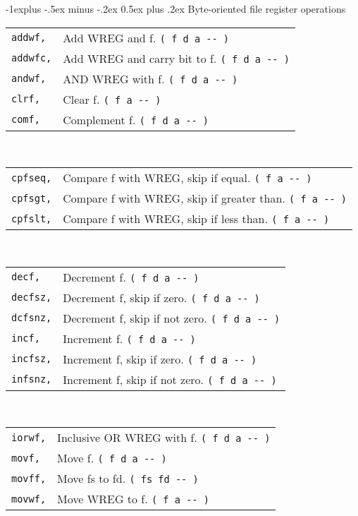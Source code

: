 \documentclass[10pt,landscape,a4paper]{article}
\makeatletter
\renewcommand{\subsection}{\@startsection{subsection}{2}{0mm}%
                                {-1explus -.5ex minus -.2ex}%
                                {0.5ex plus .2ex}%
                                {\normalfont\normalsize\bfseries}}
\makeatother
\begin{document}
\begin{multicols}{3}
\subsection{Byte-oriented file register operations}
\begin{tabular}{@{}ll@{}}
\verb!addwf,!  & Add WREG and f. \verb!( f d a -- )! \\
\verb!addwfc,!  & Add WREG and carry bit to f. \verb!( f d a -- )! \\
\verb!andwf,!  & AND WREG with f. \verb!( f d a -- )! \\
\verb!clrf,!  & Clear f. \verb!( f a -- )! \\
\verb!comf,!  & Complement f. \verb!( f d a -- )! \\
\end{tabular} \\
\begin{tabular}{@{}ll@{}}
\verb!cpfseq,!  & Compare f with WREG, skip if equal. \verb!( f a -- )! \\
\verb!cpfsgt,!  & Compare f with WREG, skip if greater than. \verb!( f a -- )! \\
\verb!cpfslt,!  & Compare f with WREG, skip if less than. \verb!( f a -- )! \\
\end{tabular} \\
\begin{tabular}{@{}ll@{}}
\verb!decf,!  & Decrement f. \verb!( f d a -- )! \\
\verb!decfsz,!  & Decrement f, skip if zero. \verb!( f d a -- )! \\
\verb!dcfsnz,!  & Decrement f, skip if not zero. \verb!( f d a -- )! \\
\verb!incf,!  & Increment f. \verb!( f d a -- )! \\
\verb!incfsz,!  & Increment f, skip if zero. \verb!( f d a -- )! \\
\verb!infsnz,!  & Increment f, skip if not zero. \verb!( f d a -- )! \\
\end{tabular} \\
\begin{tabular}{@{}ll@{}}
\verb!iorwf,!  & Inclusive OR WREG with f. \verb!( f d a -- )! \\
\verb!movf,! & Move f. \verb!( f d a -- )! \\
\verb!movff,! & Move fs to fd. \verb!( fs fd -- )! \\
\verb!movwf,!  & Move WREG to f. \verb!( f a -- )! \\

\end{tabular}
\end{multicols}
\end{document}
